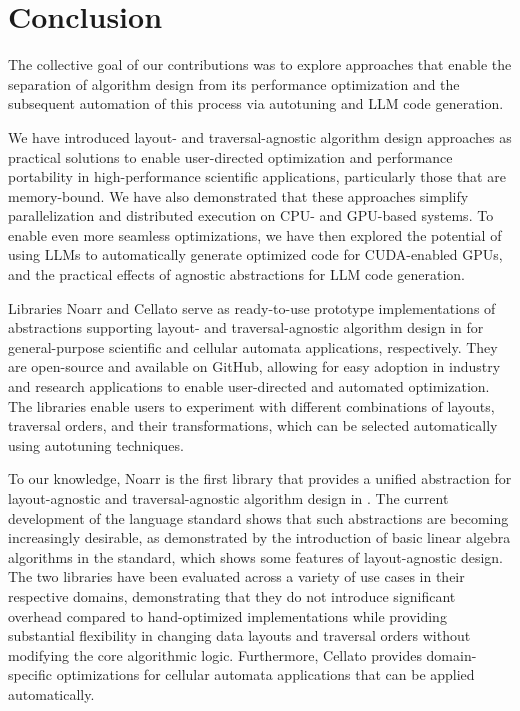\chapter{Conclusion}\label{chap:conclusion}

The collective goal of our contributions was to explore approaches that enable the separation of algorithm design from its performance optimization and the subsequent automation of this process via autotuning and LLM code generation.

We have introduced layout- and traversal-agnostic algorithm design approaches as practical solutions to enable user-directed optimization and performance portability in high-performance scientific applications, particularly those that are memory-bound. We have also demonstrated that these approaches simplify parallelization and distributed execution on CPU- and GPU-based systems. To enable even more seamless optimizations, we have then explored the potential of using LLMs to automatically generate optimized code for CUDA-enabled GPUs, and the practical effects of agnostic abstractions for LLM code generation.

Libraries Noarr and Cellato serve as ready-to-use prototype implementations of abstractions supporting layout- and traversal-agnostic algorithm design in \cpp for general-purpose scientific and cellular automata applications, respectively. They are open-source and available on GitHub, allowing for easy adoption in industry and research applications to enable user-directed and automated optimization. The libraries enable users to experiment with different combinations of layouts, traversal orders, and their transformations, which can be selected automatically using autotuning techniques.

To our knowledge, Noarr is the first library that provides a unified abstraction for layout-agnostic and traversal-agnostic algorithm design in \cpp. The current development of the language standard shows that such abstractions are becoming increasingly desirable, as demonstrated by the introduction of basic linear algebra algorithms in the \cpptwentysix standard, which shows some features of layout-agnostic design. The two libraries have been evaluated across a variety of use cases in their respective domains, demonstrating that they do not introduce significant overhead compared to hand-optimized implementations while providing substantial flexibility in changing data layouts and traversal orders without modifying the core algorithmic logic. Furthermore, Cellato provides domain-specific optimizations for cellular automata applications that can be applied automatically.

